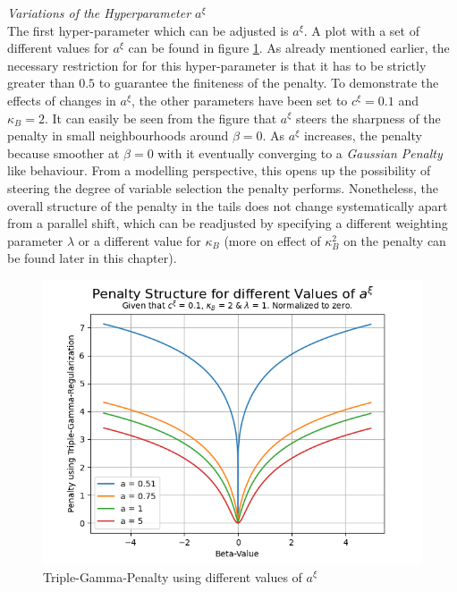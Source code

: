 \documentclass[12pt,a4paper]{article}
\begin{document}
\newpage

\textit{Variations of the Hyperparameter $a^\xi$}\\

The first hyper-parameter which can be adjusted is $a^\xi$. A plot with a set of different values for $a^\xi$ can be found in figure \ref{fig:VariationInA}. As already mentioned earlier, the necessary restriction for for this hyper-parameter is that it has to be strictly greater than $0.5$ to guarantee the finiteness of the penalty. To demonstrate the effects of changes in $a^\xi$, the other parameters have been set to $c^\xi=0.1$ and $\kappa_B=2$. It can easily be seen from the figure that $a^\xi$ steers the sharpness of the penalty in small neighbourhoods around $\beta=0$. As $a^\xi$ increases, the penalty because smoother at $\beta=0$ with it eventually converging to a \textit{Gaussian Penalty} like behaviour. From a modelling perspective, this opens up the possibility of steering the degree of variable selection the penalty performs. Nonetheless, the overall structure of the penalty in the tails does not change systematically apart from a parallel shift, which can be readjusted by specifying a different weighting parameter $\lambda$ or a different value for $\kappa_B$ (more on effect of $\kappa_B^2$ on the penalty can be found later in this chapter).\\ 

\begin{figure}[h!]
\centering
\includegraphics[scale=0.75]{../02_simulation/021_simulation_figures/TGPenalty_ChangeInA.png}
\caption{Triple-Gamma-Penalty using different values of $a^\xi$}
\label{fig:VariationInA}
\end{figure}
\end{document}
